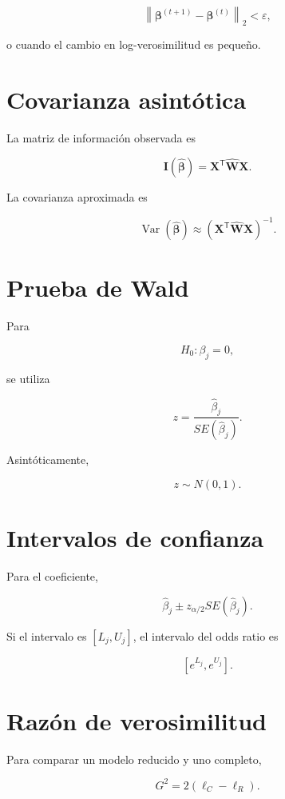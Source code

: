 \documentclass[
  spanish,
  11pt,
  letterpaper,
  DIV=11,
  numbers=noendperiod]{scrreprt}
\theoremstyle{definition}
\theoremstyle{plain}
\theoremstyle{definition}
\theoremstyle{remark}
\begin{document}
\[
\left\|
\boldsymbol{\beta}^{(t+1)}
-
\boldsymbol{\beta}^{(t)}
\right\|_2
<
\varepsilon,
\]

o cuando el cambio en log-verosimilitud es pequeño.

\section{Covarianza asintótica}\label{covarianza-asintuxf3tica}

La matriz de información observada es

\[
\mathbf{I}
(
\widehat{\boldsymbol{\beta}}
)
=
\mathbf{X}^{\mathsf T}
\widehat{\mathbf{W}}
\mathbf{X}.
\]

La covarianza aproximada es

\[
\operatorname{Var}
(
\widehat{\boldsymbol{\beta}}
)
\approx
\left(
\mathbf{X}^{\mathsf T}
\widehat{\mathbf{W}}
\mathbf{X}
\right)^{-1}.
\]

\section{Prueba de Wald}\label{prueba-de-wald}

Para

\[
H_0:\beta_j=0,
\]

se utiliza

\[
z
=
\frac{\widehat{\beta}_j}
{SE(\widehat{\beta}_j)}.
\]

Asintóticamente,

\[
z\sim N(0,1).
\]

\section{Intervalos de confianza}\label{intervalos-de-confianza-1}

Para el coeficiente,

\[
\widehat{\beta}_j
\pm
z_{\alpha/2}
SE(\widehat{\beta}_j).
\]

Si el intervalo es \([L_j,U_j]\), el intervalo del odds ratio es

\[
[e^{L_j},e^{U_j}].
\]

\section{Razón de verosimilitud}\label{razuxf3n-de-verosimilitud}

Para comparar un modelo reducido y uno completo,

\[
G^2
=
2(\ell_C-\ell_R).
\]
\end{document}
